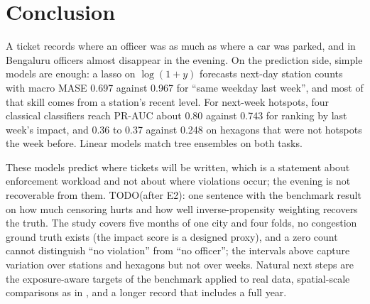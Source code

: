 \section{Conclusion}
A ticket records where an officer was as much as where a car was parked, and in Bengaluru officers almost disappear in the evening. On the prediction side, simple models are enough: a lasso on $\log(1+y)$ forecasts next-day station counts with macro MASE 0.697 against 0.967 for ``same weekday last week'', and most of that skill comes from a station's recent level. For next-week hotspots, four classical classifiers reach PR-AUC about 0.80 against 0.743 for ranking by last week's impact, and 0.36 to 0.37 against 0.248 on hexagons that were not hotspots the week before. Linear models match tree ensembles on both tasks.

These models predict where tickets will be written, which is a statement about enforcement workload and not about where violations occur; the evening is not recoverable from them. TODO(after E2): one sentence with the benchmark result on how much censoring hurts and how well inverse-propensity weighting recovers the truth. The study covers five months of one city and four folds, no congestion ground truth exists (the impact score is a designed proxy), and a zero count cannot distinguish ``no violation'' from ``no officer''; the intervals above capture variation over stations and hexagons but not over weeks. Natural next steps are the exposure-aware targets of the benchmark applied to real data, spatial-scale comparisons as in \citet{gao2019parking}, and a longer record that includes a full year.
